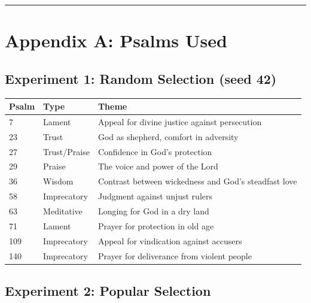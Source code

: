 \documentclass[10pt, letterpaper, twocolumn]{article}
\begin{document}
\begin{center}\rule{0.5\linewidth}{0.5pt}\end{center}

\section*{Appendix A: Psalms Used}\label{appendix-a-psalms-used}

\subsection*{Experiment 1: Random Selection (seed 42)}\label{experiment-1-random-selection-seed-42}

{\def\LTcaptype{none} %
\begin{tabular}[]{@{}lll@{}}
\toprule\noalign{}
Psalm & Type & Theme \\
\midrule\noalign{}
\bottomrule\noalign{}
7 & Lament & Appeal for divine justice against persecution \\
23 & Trust & God as shepherd, comfort in adversity \\
27 & Trust/Praise & Confidence in God's protection \\
29 & Praise & The voice and power of the Lord \\
36 & Wisdom & Contrast between wickedness and God's steadfast love \\
58 & Imprecatory & Judgment against unjust rulers \\
63 & Meditative & Longing for God in a dry land \\
71 & Lament & Prayer for protection in old age \\
109 & Imprecatory & Appeal for vindication against accusers \\
140 & Imprecatory & Prayer for deliverance from violent people \\
\end{tabular}
}

\subsection*{Experiment 2: Popular Selection}\label{experiment-2-popular-selection}
\end{document}
